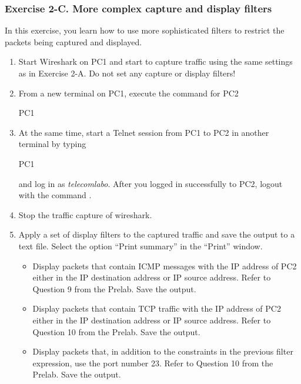 
\subsubsection{Exercise 2-C. More complex capture and display filters}

In this exercise, you learn how to use more sophisticated filters to restrict the packets being captured and displayed.

\begin{enumerate}
	\item Start Wireshark on PC1 and start to capture traffic using the same settings as in Exercise 2-A. Do not set any capture or display filters!
	\item From a new terminal on PC1, execute the  command for PC2 
		\begin{cmdblock}
	PC1%
		\end{cmdblock}
	\item At the same time, start a Telnet session from PC1 to PC2 in another terminal by typing
		\begin{cmdblock}
	PC1%
		\end{cmdblock}
		and log in as \textit{telecomlabo}. After you logged in successfully to PC2, logout with the command .
	\item Stop the traffic capture of wireshark.
	\item Apply a set of display filters to the captured traffic and save the output to a text file. Select the option ``Print summary'' in the ``Print'' window.
		\begin{itemize}
			\item Display packets that contain ICMP messages with the IP address of PC2 either in the IP destination address or IP source address. Refer to Question 9 from the Prelab. Save the output.
			\item Display packets that contain TCP traffic with the IP address of PC2 either in the IP destination address or IP source address. Refer to Question 10 from the Prelab. Save the output.
			\item Display packets that, in addition to the constraints in the previous filter expression, use the port number 23. Refer to Question 10 from the Prelab. Save the output.
		\end{itemize}
\end{enumerate}

